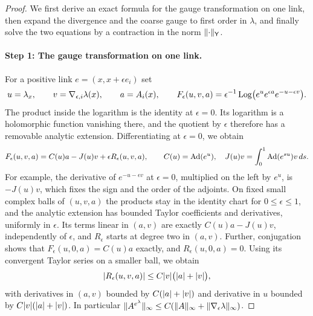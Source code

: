 \begin{proof}
We first derive an exact formula for the gauge transformation on one link, then expand the divergence and the coarse gauge to first order in $\lambda$, and finally solve the two equations by a contraction in the norm $\lVert \cdot\rVert_{\mathsf Y}$.

\paragraph{Step 1: The gauge transformation on one link.}
For a positive link $e=(x,x+\epsilon e_i)$ set
\[
 u=\lambda_x,\qquad v=\nabla_{\epsilon,i}\lambda(x),\qquad a=A_i(x),\qquad F_\epsilon(u,v,a)=\epsilon^{-1}\operatorname{Log}\bigl(e^ue^{\epsilon a}e^{-u-\epsilon v}\bigr).
\]
The product inside the logarithm is the identity at $\epsilon=0$. Its logarithm is a holomorphic function vanishing there, and the quotient by $\epsilon$ therefore has a removable analytic extension. Differentiating at $\epsilon=0$, we obtain
\begin{equation}\label{ch06:eq:gauge-word-local}
 F_\epsilon(u,v,a)=C(u)a-J(u)v+\epsilon R_\epsilon(u,v,a),\qquad C(u)=\operatorname{Ad}(e^u),\quad J(u)v=\int_0^1\operatorname{Ad}(e^{su})v\,ds.
\end{equation}
For example, the derivative of $e^{-u-\epsilon v}$ at $\epsilon=0$, multiplied on the left by $e^u$, is $-J(u)v$, which fixes the sign and the order of the adjoints. On fixed small complex balls of $(u,v,a)$ the products stay in the identity chart for $0\le\epsilon\le1$, and the analytic extension has bounded Taylor coefficients and derivatives, uniformly in $\epsilon$. Its terms linear in $(a,v)$ are exactly $C(u)a-J(u)v$, independently of $\epsilon$, and $R_\epsilon$ starts at degree two in $(a,v)$. Further, conjugation shows that $F_\epsilon(u,0,a)=C(u)a$ exactly, and $R_\epsilon(u,0,a)=0$. Using its convergent Taylor series on a smaller ball, we obtain
\begin{equation}\label{ch06:eq:gauge-word-remainder}
 \lvert R_\epsilon(u,v,a)\rvert\le C\lvert v\rvert\bigl(\lvert a\rvert+\lvert v\rvert\bigr),
\end{equation}
with derivatives in $(a,v)$ bounded by $C(\lvert a\rvert+\lvert v\rvert)$ and derivative in $u$ bounded by $C\lvert v\rvert(\lvert a\rvert+\lvert v\rvert)$. In particular $\lVert A^{e^\lambda}\rVert_\infty\le C(\lVert A\rVert_\infty+\lVert \nabla_\epsilon\lambda\rVert_\infty)$.


\end{proof}
